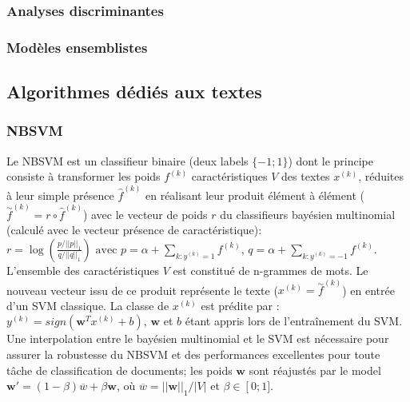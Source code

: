 %
%
%
%
 
\subsubsection{Analyses discriminantes}

\subsubsection{Modèles ensemblistes}


\subsection{Algorithmes dédiés aux textes}

\subsubsection{NBSVM}

Le NBSVM \citep{wang2012nbsvm} est un classifieur binaire (deux labels $\lbrace -1; 1 \rbrace$) dont le principe consiste à transformer les poids $f^{(k)}$ caractéristiques $V$ des textes $x^{(k)}$, réduites à leur simple présence $\widehat{f}^{(k)}$ en réalisant leur produit élément à élément ($\overset{\sim}{f}^{(k)} = {r} \circ \widehat{f}^{(k)}$) avec le vecteur de poids $r$ du classifieurs bayésien multinomial (calculé avec le vecteur présence de caractéristique):
$r = \log \left( \frac{p/\vert\vert p \vert\vert_1}{q / \vert\vert q \vert\vert_1}\right)
\text{ avec } p=\alpha + \sum\limits_{k:y^{(k)}=1}{f}^{(k)}$, $q=\alpha + \sum\limits_{k:y^{(k)}=-1}{f}^{(k)}$. L'ensemble des caractéristiques $V$ est constitué de n-grammes de mots. Le nouveau vecteur issu de ce produit représente le texte ($x^{(k)} = \overset{\sim}{f}^{(k)}$) en entrée d'un SVM classique. La classe de $x^{(k)}$ est prédite par : $y^{(k)} = sign(\mathbf{w}^Tx^{(k)} + b)$, $\mathbf{w}$ et $b$ étant appris lors de l'entraînement du SVM. Une interpolation  entre le bayésien multinomial et le SVM est nécessaire pour assurer la robustesse du NBSVM et des performances excellentes pour toute tâche de classification de documents; les poids $\mathbf{w}$ sont réajustés par le model $\mathbf{w'} = (1 - \beta) \overline{w} + \beta \mathbf{w}$, où $\overline{w} = \vert\vert \mathbf{w}\vert\vert_1 / \vert V \vert$ et $\beta \in \left[0; 1] \right.$. 
  
